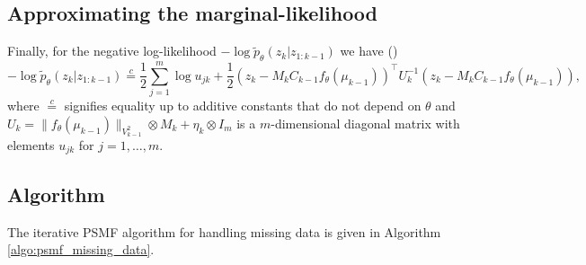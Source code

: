 \documentclass{mldsmsc}
\begin{document}
\subsection{Approximating the marginal-likelihood}

Finally, for the negative log-likelihood \(-\log \tilde{p}_\theta (z_k | z_{1:k-1})\) we have (\cite{akyildiz2021probabilistic})
\begin{equation}
-\log \tilde{p}_\theta (z_k | z_{1:k-1}) \overset{c}{=} \frac{1}{2} \sum_{j=1}^{m} \log u_{jk} + \frac{1}{2} (z_k - M_k C_{k-1} f_\theta(\mu_{k-1}))^\top U_k^{-1} (z_k - M_k C_{k-1} f_\theta(\mu_{k-1})),
\end{equation}
where \(\overset{c}{=}\) signifies equality up to additive constants that do not depend on $\theta$ and \(U_k = \|f_\theta(\mu_{k-1})\|_{V_{k-1}^2} \otimes M_k + \eta_k \otimes I_m\) is a \(m\)-dimensional diagonal matrix with elements \(u_{jk}\) for \(j = 1, \ldots, m\). \newline

\subsection{Algorithm}

The iterative PSMF algorithm for handling missing data is given in Algorithm \ref{algo:psmf_missing_data}.
\end{document}
